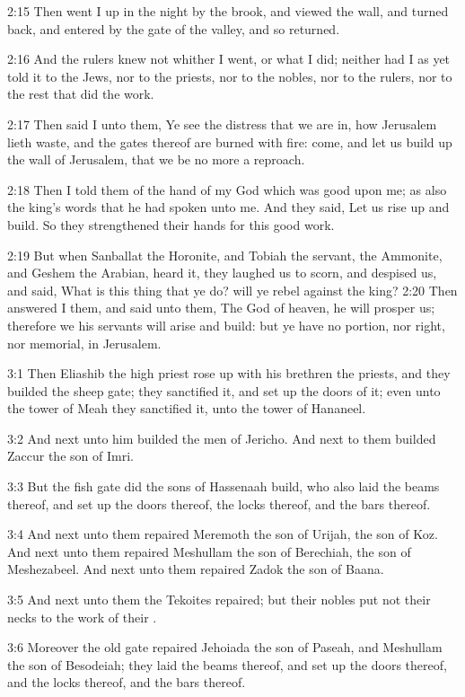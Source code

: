 2:15 Then went I up in the night by the brook, and viewed the wall,
and turned back, and entered by the gate of the valley, and so
returned.

2:16 And the rulers knew not whither I went, or what I did; neither
had I as yet told it to the Jews, nor to the priests, nor to the
nobles, nor to the rulers, nor to the rest that did the work.

2:17 Then said I unto them, Ye see the distress that we are in, how
Jerusalem lieth waste, and the gates thereof are burned with fire:
come, and let us build up the wall of Jerusalem, that we be no more a
reproach.

2:18 Then I told them of the hand of my God which was good upon me; as
also the king's words that he had spoken unto me. And they said, Let
us rise up and build. So they strengthened their hands for this good
work.

2:19 But when Sanballat the Horonite, and Tobiah the servant, the
Ammonite, and Geshem the Arabian, heard it, they laughed us to scorn,
and despised us, and said, What is this thing that ye do? will ye
rebel against the king?  2:20 Then answered I them, and said unto
them, The God of heaven, he will prosper us; therefore we his servants
will arise and build: but ye have no portion, nor right, nor memorial,
in Jerusalem.

3:1 Then Eliashib the high priest rose up with his brethren the
priests, and they builded the sheep gate; they sanctified it, and set
up the doors of it; even unto the tower of Meah they sanctified it,
unto the tower of Hananeel.

3:2 And next unto him builded the men of Jericho. And next to them
builded Zaccur the son of Imri.

3:3 But the fish gate did the sons of Hassenaah build, who also laid
the beams thereof, and set up the doors thereof, the locks thereof,
and the bars thereof.

3:4 And next unto them repaired Meremoth the son of Urijah, the son of
Koz. And next unto them repaired Meshullam the son of Berechiah, the
son of Meshezabeel. And next unto them repaired Zadok the son of
Baana.

3:5 And next unto them the Tekoites repaired; but their nobles put not
their necks to the work of their \LORD.

3:6 Moreover the old gate repaired Jehoiada the son of Paseah, and
Meshullam the son of Besodeiah; they laid the beams thereof, and set
up the doors thereof, and the locks thereof, and the bars thereof.

